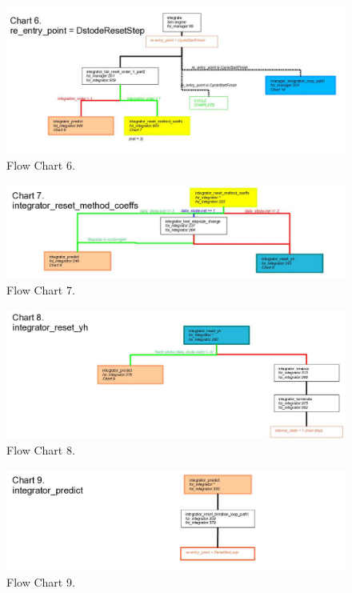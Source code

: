 \begin{figure}[htp]
\begin{center}
\includegraphics[width=6.5in]{figures/lsode_flow6.jpg}
\caption{Flow Chart 6.}
\end{center}
\end{figure}

\begin{figure}[htp]
\begin{center}
\includegraphics[width=6.5in]{figures/lsode_flow7.jpg}
\caption{Flow Chart 7.}
\end{center}
\end{figure}

\begin{figure}[htp]
\begin{center}
\includegraphics[width=6.5in]{figures/lsode_flow8.jpg}
\caption{Flow Chart 8.}
\end{center}
\end{figure}

\begin{figure}[htp]
\begin{center}
\includegraphics[width=6.5in]{figures/lsode_flow9.jpg}
\caption{Flow Chart 9.}
\end{center}
\end{figure}

